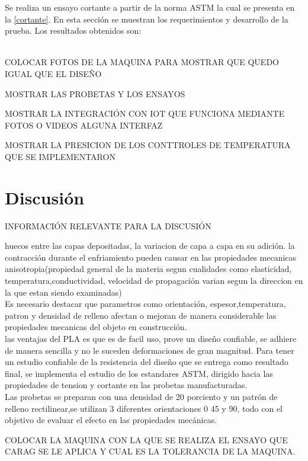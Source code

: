 Se realiza un ensayo cortante a partir de la norma \acrshort{ASTM} la cual se presenta en la \autoref{cortante}. En esta sección se muestran los requerimientos y desarrollo de la prueba. Los resultados obtenidos son:

\\


COLOCAR FOTOS DE LA MAQUINA PARA MOSTRAR QUE QUEDO IGUAL QUE EL DISEÑO

MOSTRAR LAS PROBETAS Y LOS ENSAYOS

MOSTRAR LA INTEGRACIÓN CON IOT QUE FUNCIONA MEDIANTE FOTOS O VIDEOS ALGUNA INTERFAZ

MOSTRAR LA PRESICION DE LOS CONTTROLES DE TEMPERATURA QUE SE IMPLEMENTARON




\section{Discusión }

INFORMACIÓN RELEVANTE PARA LA DISCUSIÓN 

huecos entre las capas depositadas, la variacion de capa a capa en su adición. la contracción durante el enfriamiento pueden causar en las propiedades mecanicas anisotropia(propiedad general de la materia segun cualidades como elasticidad, temperatura,conductividad, velocidad de propagación varian segun la direccion en la que estan siendo examinadas)\\

Es necesario destacar que parametros como orientación, espesor,temperatura, patron y densidad de relleno afectan o mejoran  de manera considerable las propiedades mecanicas del objeto en construcción. \\


las ventajas del PLA es que es de facil uso, prove un diseño confiable, se adhiere de manera sencilla y no le suceden deformaciones de gran magnitud. Para tener un estudio confiable de la resistencia del diseño que se entrega como resultado final, se implementa el estudio de los estandares ASTM, dirigido hacia las propiedades de tension y cortante en las probetas manufacturadas.\\

Las probetas se preparan con una densidad de 20 porciento y un patrón de relleno rectilinear,se utilizan 3 diferentes orientaciones 0 45 y 90, todo con el objetivo de evaluar el efecto en las propiedades mecánicas.

COLOCAR LA MAQUINA CON LA QUE SE REALIZA EL ENSAYO QUE CARAG SE LE APLICA Y CUAL ES LA TOLERANCIA DE LA MAQUINA. 

